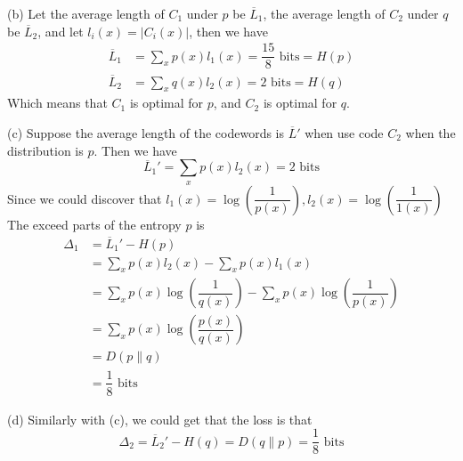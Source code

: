 (b) Let the average length of $C_1$ under $p$ be $\overline{L}_1$, the average length of $C_2$ under $q$ be $\overline{L}_2$, and let $l_i(x)=|C_i(x)|$, then we have
\begin{align*}
\overline{L}_1 &= \sum_{x}p(x)l_1(x) = \dfrac{15}{8} \text{\ bits} = H(p) \\
\overline{L}_2 &= \sum_{x}q(x)l_2(x) = 2 \text{\ bits} = H(q)
\end{align*}
Which means that $C_1$ is optimal for $p$, and $C_2$ is optimal for $q$.

(c) Suppose the average length of the codewords is $\overline{L}'$ when use code $C_2$ when the distribution is $p$.
Then we have
$$\overline{L}_1'=\sum_{x}p(x)l_2(x)=2 \text{\ bits}$$
Since we could discover that $l_1(x)=\log\left(\dfrac{1}{p(x)}\right), l_2(x)=\log\left(\dfrac{1}{1(x)}\right)$
The exceed parts of the entropy $p$ is
\begin{align*}
\Delta_1 &= \overline{L}_1'-H(p) \\
&= \sum_{x}p(x)l_2(x)-\sum_{x}p(x)l_1(x) \\
&= \sum_{x}p(x)\log\left(\dfrac{1}{q(x)}\right) - \sum_{x}p(x)\log\left(\dfrac{1}{p(x)}\right) \\
&= \sum_{x}p(x)\log\left(\dfrac{p(x)}{q(x)}\right) \\
&= D\left(p\|q\right) \\
&= \dfrac{1}{8} \text{\ bits}
\end{align*}

(d) Similarly with (c), we could get that the loss is that
$$\Delta_2 = \overline{L}_2'-H(q) = D\left(q\|p\right) = \dfrac{1}{8} \text{\ bits}$$

\newpage